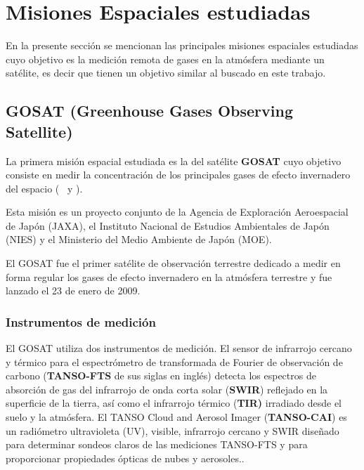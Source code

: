 \documentclass[11pt,titlepage]{article}
\begin{document}
\section{Misiones Espaciales estudiadas}
En la presente sección se mencionan las principales misiones espaciales estudiadas cuyo objetivo es la medición remota de gases en la atmósfera mediante un satélite, es decir que tienen un objetivo similar al buscado en este trabajo.

\subsection{GOSAT (Greenhouse Gases Observing Satellite) }

La primera misión espacial estudiada es la del satélite \textbf{GOSAT} cuyo objetivo consiste en medir la concentración de los principales gases de efecto invernadero del espacio (\dioxcarb~ y \metano).\par
Esta misión es un proyecto conjunto de la Agencia de Exploración Aeroespacial de Japón (JAXA), el Instituto Nacional de Estudios Ambientales de Japón (NIES) y el Ministerio del Medio Ambiente de Japón (MOE).\par

El GOSAT fue el primer satélite de observación terrestre dedicado a medir en forma regular los gases de efecto invernadero en la atmósfera terrestre y fue lanzado el 23 de enero de 2009.


\subsubsection{Instrumentos de medición}

El GOSAT utiliza dos instrumentos de medición. El sensor de infrarrojo cercano y térmico para el espectrómetro de transformada de Fourier de observación de carbono (\textbf{TANSO-FTS} de sus siglas en inglés) detecta los espectros de absorción de gas del infrarrojo de onda corta solar (\textbf{SWIR}) reflejado en la superficie de la tierra, así como el infrarrojo térmico (\textbf{TIR)} irradiado desde el suelo y la atmósfera. El TANSO Cloud and Aerosol Imager (\textbf{TANSO-CAI}) es un radiómetro ultravioleta (UV), visible, infrarrojo cercano y SWIR diseñado para determinar sondeos claros de las mediciones TANSO-FTS y para proporcionar propiedades ópticas de nubes y aerosoles.\cite{MissionGOSAT}.
\end{document}
